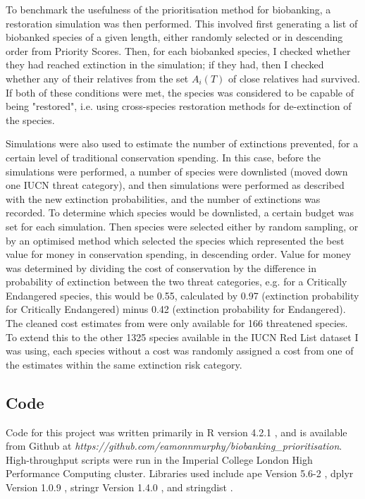 \documentclass[10pt]{article}
\begin{document}
	To benchmark the usefulness of the prioritisation method for biobanking, a restoration simulation
	was then performed. This involved first generating a list of biobanked species of a given length,
	either randomly selected or in descending order from Priority Scores. Then, for each biobanked
	species, I checked whether they had reached extinction in the simulation; if they had, then I 
	checked whether any of their relatives from the set $A_i(T)$ of close relatives had survived.
	If both of these conditions were met, the species was considered to be capable of being "restored",
	i.e. using cross-species restoration methods for de-extinction of the species.
	
	Simulations were also used to estimate the number of extinctions prevented, for a certain level
	of traditional conservation spending. In this case, before the simulations were performed, a
	number of species were downlisted (moved down one IUCN threat category), and then simulations
	were performed as described with the new extinction probabilities, and the number of extinctions
	was recorded. To determine which species would be downlisted, a certain budget was set for each
	simulation. Then species were selected either by random sampling, or by an optimised method
	which selected the species which represented the best value for money in conservation spending,
	in descending order. Value for money was determined by dividing the cost of conservation
	by the difference in probability of extinction between the two threat categories, e.g. for
	a Critically Endangered species, this would be 0.55,
	calculated by 0.97 (extinction probability for Critically
	Endangered) minus 0.42 (extinction probability for Endangered). The cleaned cost estimates
	from \citep{mccarthyFinancialCostsMeeting2012} were only available for 166 threatened species.
	To extend this to the other 1325 species available in the IUCN Red List dataset I was 
	using, each species without a cost was randomly assigned a cost from one of the estimates within
	the same extinction risk category.
	
	\subsection{Code}
	Code for this project was written primarily in R version 4.2.1 \citep{rcite},
	and is available from Github at
	\textit{https://github.com/eamonnmurphy/biobanking\_prioritisation}.
	High-throughput scripts were
	run in the Imperial College London High Performance Computing cluster. Libraries used
	include ape Version 5.6-2 \citep{paradisApeEnvironmentModern2019},
	dplyr Version 1.0.9 \citep{dplyr},
	stringr Version 1.4.0 \citep{stringr}, and stringdist \citep{stringdist}.
	
\end{document}
